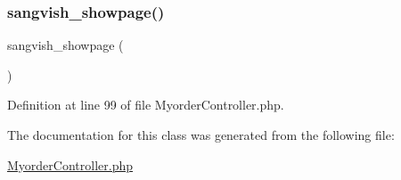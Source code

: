 \subsubsection{\texorpdfstring{sangvish\_showpage()}{sangvish\_showpage()}}
{\footnotesize\ttfamily sangvish\+\_\+showpage (\begin{DoxyParamCaption}{ }\end{DoxyParamCaption})}



Definition at line 99 of file Myorder\+Controller.\+php.



The documentation for this class was generated from the following file\+:\begin{DoxyCompactItemize}
\item 
\mbox{\hyperlink{_myorder_controller_8php}{Myorder\+Controller.\+php}}\end{DoxyCompactItemize}
